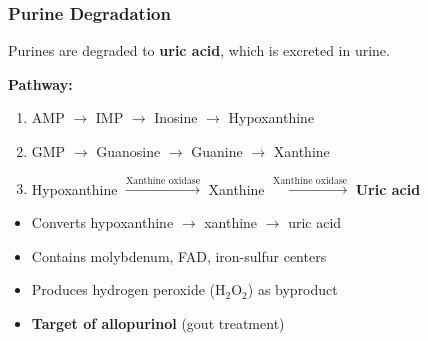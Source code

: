 \subsubsection{Purine Degradation}

Purines are degraded to \textbf{uric acid}, which is excreted in urine.

\textbf{Pathway:}
\begin{enumerate}
    \item AMP $\rightarrow$ IMP $\rightarrow$ Inosine $\rightarrow$ Hypoxanthine
    \item GMP $\rightarrow$ Guanosine $\rightarrow$ Guanine $\rightarrow$ Xanthine
    \item Hypoxanthine $\xrightarrow{\text{Xanthine oxidase}}$ Xanthine $\xrightarrow{\text{Xanthine oxidase}}$ \textbf{Uric acid}
\end{enumerate}

\begin{tcolorbox}[colback=yellow!10, colframe=yellow!70!black, title=\textbf{Xanthine Oxidase: Key Enzyme in Purine Degradation}]
\begin{itemize}
    \item Converts hypoxanthine $\rightarrow$ xanthine $\rightarrow$ uric acid
    \item Contains molybdenum, FAD, iron-sulfur centers
    \item Produces hydrogen peroxide (H$_2$O$_2$) as byproduct
    \item \textbf{Target of allopurinol} (gout treatment)
\end{itemize}
\end{tcolorbox}

